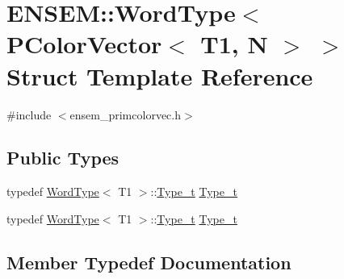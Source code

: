 \hypertarget{structENSEM_1_1WordType_3_01PColorVector_3_01T1_00_01N_01_4_01_4}{}\section{E\+N\+S\+EM\+:\+:Word\+Type$<$ P\+Color\+Vector$<$ T1, N $>$ $>$ Struct Template Reference}
\label{structENSEM_1_1WordType_3_01PColorVector_3_01T1_00_01N_01_4_01_4}


{\ttfamily \#include $<$ensem\+\_\+primcolorvec.\+h$>$}

\subsection*{Public Types}
\begin{DoxyCompactItemize}
\item 
typedef \mbox{\hyperlink{structENSEM_1_1WordType}{Word\+Type}}$<$ T1 $>$\+::\mbox{\hyperlink{structENSEM_1_1WordType_3_01PColorVector_3_01T1_00_01N_01_4_01_4_a86e73ce3277cd28d9e0550e1989ad245}{Type\+\_\+t}} \mbox{\hyperlink{structENSEM_1_1WordType_3_01PColorVector_3_01T1_00_01N_01_4_01_4_a86e73ce3277cd28d9e0550e1989ad245}{Type\+\_\+t}}
\item 
typedef \mbox{\hyperlink{structENSEM_1_1WordType}{Word\+Type}}$<$ T1 $>$\+::\mbox{\hyperlink{structENSEM_1_1WordType_3_01PColorVector_3_01T1_00_01N_01_4_01_4_a86e73ce3277cd28d9e0550e1989ad245}{Type\+\_\+t}} \mbox{\hyperlink{structENSEM_1_1WordType_3_01PColorVector_3_01T1_00_01N_01_4_01_4_a86e73ce3277cd28d9e0550e1989ad245}{Type\+\_\+t}}
\end{DoxyCompactItemize}


\subsection{Member Typedef Documentation}
\mbox{\label{structENSEM_1_1WordType_3_01PColorVector_3_01T1_00_01N_01_4_01_4_a86e73ce3277cd28d9e0550e1989ad245}} 
